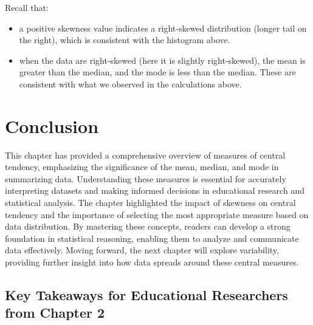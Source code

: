 \documentclass[
  letterpaper,
  DIV=11,
  numbers=noendperiod]{scrreprt}
\begin{document}
Recall that:

\begin{itemize}
\item
  a positive skewness value indicates a right-skewed distribution
  (longer tail on the right), which is consistent with the histogram
  above.
\item
  when the data are right-skewed (here it is slightly right-skewed), the
  mean is greater than the median, and the mode is less than the median.
  These are consistent with what we observed in the calculations above.
\end{itemize}


\chapter*{Conclusion}\label{conclusion-1}


This chapter has provided a comprehensive overview of measures of
central tendency, emphasizing the significance of the mean, median, and
mode in summarizing data. Understanding these measures is essential for
accurately interpreting datasets and making informed decisions in
educational research and statistical analysis. The chapter highlighted
the impact of skewness on central tendency and the importance of
selecting the most appropriate measure based on data distribution. By
mastering these concepts, readers can develop a strong foundation in
statistical reasoning, enabling them to analyze and communicate data
effectively. Moving forward, the next chapter will explore variability,
providing further insight into how data spreads around these central
measures.

\section*{Key Takeaways for Educational Researchers from Chapter
2}\label{key-takeaways-for-educational-researchers-from-chapter-2}

\end{document}
